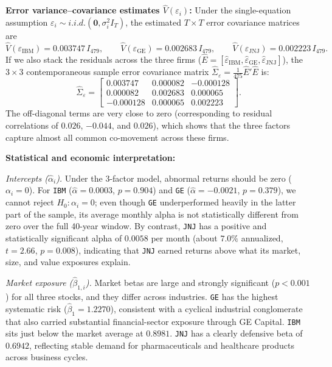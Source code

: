 \documentclass[11pt,a4paper]{article}
\begin{document}
\textbf{Error variance--covariance estimates $\hat{V}(\varepsilon_i)$:}
Under the single-equation assumption $\varepsilon_i \sim i.i.d.(\mathbf{0}, \sigma_i^2 I_T)$, the estimated $T \times T$ error covariance matrices are
\begin{equation*}
    \hat{V}(\varepsilon_{\text{IBM}}) = 0.003747\, I_{479}, \qquad
    \hat{V}(\varepsilon_{\text{GE}}) = 0.002683\, I_{479}, \qquad
    \hat{V}(\varepsilon_{\text{JNJ}}) = 0.002223\, I_{479}.
\end{equation*}
If we also stack the residuals across the three firms ($\hat{E} = [\hat{\varepsilon}_{\text{IBM}}, \hat{\varepsilon}_{\text{GE}}, \hat{\varepsilon}_{\text{JNJ}}]$), the $3 \times 3$ contemporaneous sample error covariance matrix $\hat{\Sigma}_{\varepsilon} = \frac{1}{475}\hat{E}'\hat{E}$ is:
\begin{equation*}
    \hat{\Sigma}_{\varepsilon} =
    \begin{bmatrix}
        0.003747 & 0.000082 & -0.000128 \\
        0.000082 & 0.002683 &  0.000065 \\
       -0.000128 & 0.000065 &  0.002223
    \end{bmatrix}.
\end{equation*}
The off-diagonal terms are very close to zero (corresponding to residual correlations of $0.026$, $-0.044$, and $0.026$), which shows that the three factors capture almost all common co-movement across these firms.

\textbf{Statistical and economic interpretation:}

\textit{Intercepts ($\hat{\alpha}_i$).} Under the 3-factor model, abnormal returns should be zero ($\alpha_i = 0$). For \texttt{IBM} ($\hat{\alpha} = 0.0003$, $p = 0.904$) and \texttt{GE} ($\hat{\alpha} = -0.0021$, $p = 0.379$), we cannot reject $H_0: \alpha_i = 0$; even though \texttt{GE} underperformed heavily in the latter part of the sample, its average monthly alpha is not statistically different from zero over the full 40-year window. By contrast, \texttt{JNJ} has a positive and statistically significant alpha of $0.0058$ per month (about $7.0\%$ annualized, $t = 2.66$, $p = 0.008$), indicating that \texttt{JNJ} earned returns above what its market, size, and value exposures explain.

\textit{Market exposure ($\hat{\beta}_{1,i}$).} Market betas are large and strongly significant ($p < 0.001$) for all three stocks, and they differ across industries. \texttt{GE} has the highest systematic risk ($\hat{\beta}_1 = 1.2270$), consistent with a cyclical industrial conglomerate that also carried substantial financial-sector exposure through GE Capital. \texttt{IBM} sits just below the market average at $0.8981$. \texttt{JNJ} has a clearly defensive beta of $0.6942$, reflecting stable demand for pharmaceuticals and healthcare products across business cycles.
\end{document}
